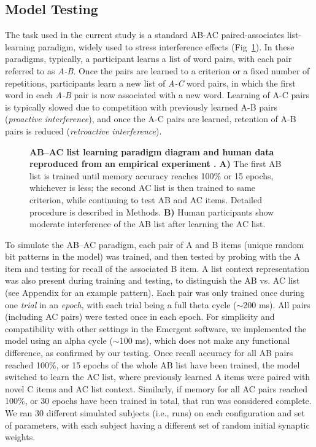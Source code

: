 \documentclass[10pt,letterpaper]{article}
\begin{document}
\subsection*{Model Testing}

The task used in the current study is a standard AB-AC paired-associates list-learning paradigm, widely used to stress interference effects \cite{BarnesUnderwood59,McCloskeyCohen89} (Fig~\ref{fig2}). In these paradigms, typically, a participant learns a list of word pairs, with each pair referred to as \emph{A-B}. Once the pairs are learned to a criterion or a fixed number of repetitions, participants learn a new list of \emph{A-C} word pairs, in which the first word in each \emph{A-B} pair is now associated with a new word. Learning of A-C pairs is typically slowed due to competition with previously learned A-B pairs (\emph{proactive interference}), and once the A-C pairs are learned, retention of A-B pairs is reduced (\emph{retroactive interference}).

\begin{figure}[!h]
  \caption{{\bf AB--AC list learning paradigm diagram and human data reproduced from an empirical experiment \cite{BarnesUnderwood59}.}
  \textbf{A)} The first AB list is trained until memory accuracy reaches 100\% or 15 epochs, whichever is less; the second AC list is then trained to same criterion, while continuing to test AB and AC items.  Detailed procedure is described in Methods. \textbf{B)} Human participants show moderate interference of the AB list after learning the AC list.}
\label{fig2}
\end{figure}

To simulate the AB--AC paradigm, each pair of A and B items (unique random bit patterns in the model) was trained, and then tested by probing with the A item and testing for recall of the associated B item.  A list context representation was also present during training and testing, to distinguish the AB vs. AC list (see Appendix for an example pattern).  Each pair was only trained once during one \emph{trial} in an \emph{epoch}, with each trial being a full theta cycle ($\sim$200 ms).  All pairs (including AC pairs) were tested once in each epoch.  For simplicity and compatibility with other settings in the Emergent software, we implemented the model using an alpha cycle ($\sim$100 ms), which does not make any functional difference, as confirmed by our testing.  Once recall accuracy for all AB pairs reached 100\%, or 15 epochs of the whole AB list have been trained, the model switched to learn the AC list, where previously learned A items were paired with novel C items and AC list context. Similarly, if memory for all AC pairs reached 100\%, or 30 epochs have been trained in total, that run was considered complete.  We ran 30 different simulated subjects (i.e., runs) on each configuration and set of parameters, with each subject having a different set of random initial synaptic weights. 
\end{document}
